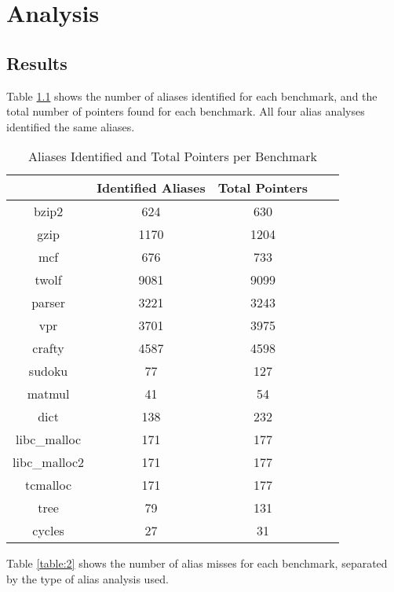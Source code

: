 \chapter{Analysis}

\section{Results}
Table \ref{table:1} shows the number of aliases identified for each benchmark, and the total number of pointers found for each benchmark. All four alias analyses identified the same aliases.

\begin{table} [h!]
\centering
   \begin{tabular} {|c|c c c c|}
      \hline
	   & Identified Aliases & Total Pointers \\
      \hline
	   bzip2 & 624 & 630 \\
      \hline
	   gzip & 1170 & 1204 \\
      \hline
           mcf & 676 & 733 \\
      \hline
	   twolf & 9081 & 9099 \\
      \hline
	   parser & 3221 & 3243 \\
      \hline
	   vpr & 3701 & 3975 \\
      \hline
	   crafty & 4587 & 4598 \\
      \hline
	   sudoku & 77 & 127 \\
      \hline
	   matmul & 41 & 54 \\
      \hline
	   dict & 138 & 232 \\
      \hline
	   libc\_malloc & 171 & 177 \\
      \hline
	   libc\_malloc2 & 171 & 177 \\
      \hline
	   tcmalloc & 171 & 177 \\
      \hline
	   tree & 79 & 131 \\
      \hline
	   cycles & 27 & 31 \\
      \hline
   \end{tabular}
   \caption{Aliases Identified and Total Pointers per Benchmark}
   \label{table:1}
\end{table}

\newpage

Table \ref{table:2} shows the number of alias misses for each benchmark, separated by the type of alias analysis used.

